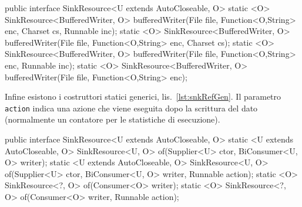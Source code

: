 \begin{elisting}[!htb]
\begin{javacode}
public interface SinkResource<U extends AutoCloseable, O> {
    static <O> SinkResource<BufferedWriter, O> bufferedWriter(File file, Function<O,String> enc, Charset cs,
                                                              Runnable inc);
    static <O> SinkResource<BufferedWriter, O> bufferedWriter(File file, Function<O,String> enc, Charset cs);
    static <O> SinkResource<BufferedWriter, O> bufferedWriter(File file, Function<O,String> enc, Runnable inc);
    static <O> SinkResource<BufferedWriter, O> bufferedWriter(File file, Function<O,String> enc);
}
\end{javacode}
\caption[Metodi per creare una risorsa \texttt{SinkResource<BufferedWriter,O>}
con funzione di codifica]{Metodi per creare una risorsa \texttt{SinkResource<BufferedWriter,O>}
con funzione di codifica \textit{O}~$\mapsto$~\texttt{String}}
\label{lst:snkRefBwEnc}
\end{elisting}

Infine esistono i costruttori statici generici, lis.~\ref{lst:snkRefGen}.
Il parametro \texttt{action} indica una azione che viene eseguita dopo la
scrittura del dato (normalmente un contatore per le statistiche di esecuzione).

\begin{elisting}[!htb]
\begin{javacode}
public interface SinkResource<U extends AutoCloseable, O> {
    static <U extends AutoCloseable, O> SinkResource<U, O> of(Supplier<U> ctor, BiConsumer<U, O> writer);
    static <U extends AutoCloseable, O> SinkResource<U, O> of(Supplier<U> ctor, BiConsumer<U, O> writer,
                                                              Runnable action);
    static <O> SinkResource<?, O> of(Consumer<O> writer);
    static <O> SinkResource<?, O> of(Consumer<O> writer, Runnable action);
}
\end{javacode}
\caption{Metodi per creare una risorsa \texttt{SinkResource} generica}
\label{lst:snkRefGen}
\end{elisting}


